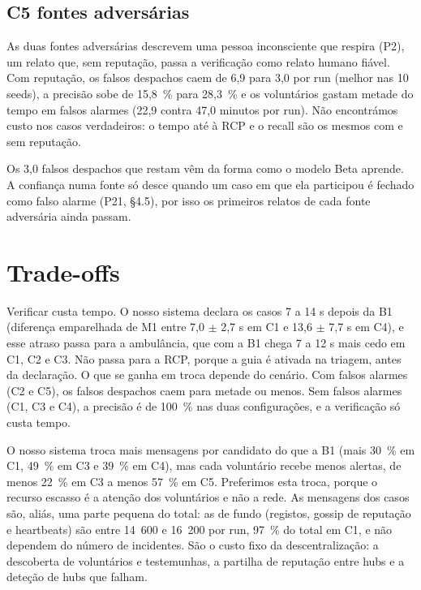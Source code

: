 \documentclass[11pt,a4paper]{article}
\begin{document}
\subsection{C5 fontes adversárias}

As duas fontes adversárias descrevem uma pessoa inconsciente que respira (P2), um relato que, sem reputação, passa a verificação como relato humano fiável. Com reputação, os falsos despachos caem de 6,9 para 3,0 por run (melhor nas 10 seeds), a precisão sobe de 15,8~\% para 28,3~\% e os voluntários gastam metade do tempo em falsos alarmes (22,9 contra 47,0 minutos por run). Não encontrámos custo nos casos verdadeiros: o tempo até à RCP e o recall são os mesmos com e sem reputação.

Os 3,0 falsos despachos que restam vêm da forma como o modelo Beta aprende. A confiança numa fonte só desce quando um caso em que ela participou é fechado como falso alarme (P21,  §4.5), por isso os primeiros relatos de cada fonte adversária ainda passam.

\section{Trade-offs}\label{sec:tradeoffs}

Verificar custa tempo. O nosso sistema declara os casos 7 a 14 s depois da B1 (diferença emparelhada de M1 entre 7,0 $\pm$ 2,7 s em C1 e 13,6 $\pm$ 7,7 s em C4), e esse atraso passa para a ambulância, que com a B1 chega 7 a 12 s mais cedo em C1, C2 e C3. Não passa para a RCP, porque a guia é ativada na triagem, antes da declaração. O que se ganha em troca depende do cenário. Com falsos alarmes (C2 e C5), os falsos despachos caem para metade ou menos. Sem falsos alarmes (C1, C3 e C4), a precisão é de 100~\% nas duas configurações, e a verificação só custa tempo.

O nosso sistema troca mais mensagens por candidato do que a B1 (mais 30~\% em C1, 49~\% em C3 e 39~\% em C4), mas cada voluntário recebe menos alertas, de menos 22~\% em C3 a menos 57~\% em C5. Preferimos esta troca, porque o recurso escasso é a atenção dos voluntários e não a rede. As mensagens dos casos são, aliás, uma parte pequena do total: as de fundo (registos, gossip de reputação e heartbeats) são entre 14~600 e 16~200 por run, 97~\% do total em C1, e não dependem do número de incidentes. São o custo fixo da descentralização: a descoberta de voluntários e testemunhas, a partilha de reputação entre hubs e a deteção de hubs que falham.
\end{document}
